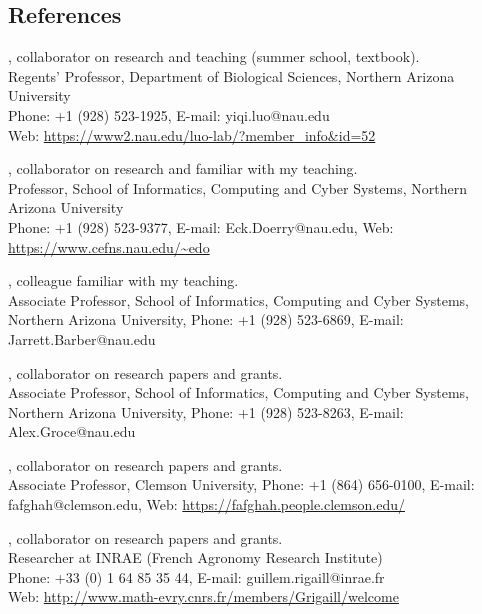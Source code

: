 \documentclass[margin,line]{res}
\begin{document}
\begin{resume}
\section{\sc References}

, collaborator on research and teaching (summer school, textbook).\\
Regents' Professor, Department of Biological Sciences, Northern Arizona University\\
Phone: +1 (928) 523-1925, E-mail: yiqi.luo@nau.edu\\
Web: \url{https://www2.nau.edu/luo-lab/?member_info&id=52}

, collaborator on research and familiar with my teaching.\\
Professor, School of Informatics, Computing and Cyber Systems, Northern Arizona University\\
Phone: +1 (928) 523-9377, E-mail: Eck.Doerry@nau.edu, Web: \url{https://www.cefns.nau.edu/~edo}

, colleague familiar with my teaching.\\
Associate Professor, School of Informatics, Computing and Cyber Systems,\\
Northern Arizona University, 
Phone: +1 (928) 523-6869, E-mail: Jarrett.Barber@nau.edu

, collaborator on research papers and grants.\\
Associate Professor, School of Informatics, Computing and Cyber Systems,\\
Northern Arizona University, 
Phone: +1 (928) 523-8263, E-mail: Alex.Groce@nau.edu

, collaborator on research papers and grants.\\
Associate Professor, Clemson University, Phone: +1 (864) 656-0100, E-mail: fafghah@clemson.edu, Web: \url{https://fafghah.people.clemson.edu/}

, collaborator on research papers and grants.\\
Researcher at INRAE (French Agronomy Research Institute)\\
Phone: +33 (0) 1 64 85 35 44, E-mail: guillem.rigaill@inrae.fr\\
Web: \url{http://www.math-evry.cnrs.fr/members/Grigaill/welcome}

\end{resume}
\end{document}
